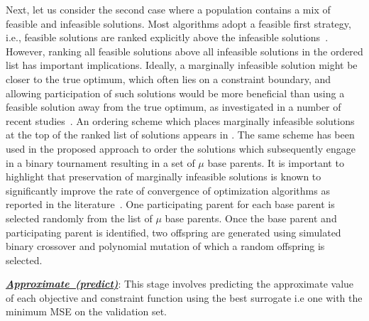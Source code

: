 Next, let us consider the second case where a population contains a mix of feasible and infeasible solutions. Most algorithms adopt a feasible first strategy, i.e., feasible solutions are ranked explicitly above the infeasible solutions~\cite{deb2001multi}. However, ranking all feasible solutions above all infeasible solutions in the ordered list has important implications\cite{KHTSingh2013idea}. Ideally, a marginally infeasible solution might be closer to the true optimum, which often lies on a constraint boundary, and allowing participation of such solutions would be more beneficial than using a feasible solution away from the true optimum, as investigated in a number of recent studies~\cite{KHTsingh2016use}. An ordering scheme which places marginally infeasible solutions at the top of the ranked list of solutions appears in \cite{KHTSingh2013idea,KHTRay2009idea}. The same scheme has been used in the proposed approach to order the solutions which subsequently engage in a binary tournament resulting in a set of $\mu$ base parents. It is important to highlight that preservation of marginally infeasible solutions is known to significantly improve the rate of convergence of optimization algorithms as reported in the literature~\cite{KHTsingh2016use, KHTtakahama2005constrained,KHTRay2009idea}. One participating parent for each base parent is selected randomly from the list of $\mu$ base parents. Once the base parent and participating parent is identified, two offspring are generated using simulated binary crossover and polynomial mutation of which a random offspring is selected.  

\noindent \underline{\it \textbf{Approximate~(predict)}}: {\color{blue}This stage involves predicting the approximate value of each objective and constraint function using the best surrogate i.e one with the minimum MSE on the validation set.}

